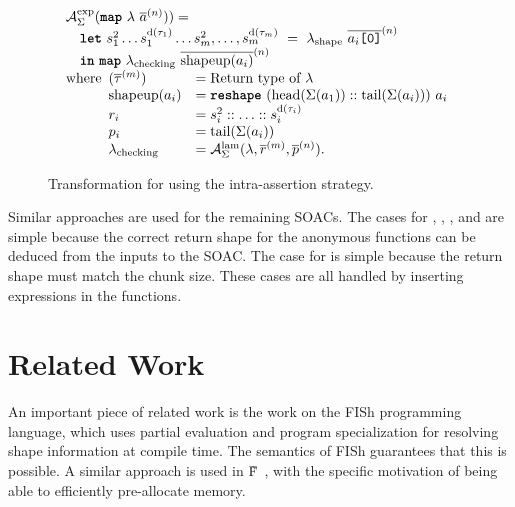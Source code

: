 \begin{figure}[t]
  \[
\begin{array}{l}
  \mathcal{A}_{\Sigma}^{\text{exp}}(\mbox{\texttt{\bfseries{map}}}~\lambda~\overline{a}^{(n)})) = \\
  \quad \mbox{\texttt{\bfseries{let}}}~s_{1}^{2} \ldots s_{1}^{\text{d}(\tau_{1})} \ldots s_{m}^{2}, \ldots, s_{m}^{\text{d}(\tau_{m})}~=~\lambda_{\text{\textrm{shape}}}~\overline{a_{i}\texttt{[0]}}^{(n)} \\
  \quad \mbox{\texttt{\bfseries{in}}}~\mbox{\texttt{\bfseries{map}}}~\lambda_{\text{checking}}~\overline{\textrm{shapeup}(a_{i})}^{(n)} \\
  \text{where}
  \begin{array}[t]{ll}
    (\overline{\tau}^{(m)}) & = \mbox{Return type of $\lambda$} \\
    \textrm{shapeup}(a_{i}) & = \mbox{\texttt{\bfseries{reshape}}}~(\textrm{head}(\Sigma(a_{1})) :: \textrm{tail}(\Sigma(a_{i})))~a_{i} \\
    r_{i} & = s_{i}^{2} :: \ldots :: s_{i}^{\text{d}(\tau_{i})} \\
    p_{i} & = \textrm{tail}(\Sigma(a_{i})) \\
    \lambda_{\text{\textrm{checking}}} & = \mathcal{A}_{\Sigma}^{\text{lam}}(\lambda,\overline{r}^{(m)},\overline{p}^{(n)}). \\

  \end{array}
\end{array}
\]

\caption[LoF entry]{Transformation for  using the
  intra-assertion strategy.}
\label{fig:sizeTransformMap}
\end{figure}

Similar approaches are used for the remaining SOACs.  The cases for
, , , and  are simple
because the correct return shape for the anonymous functions can be
deduced from the inputs to the SOAC.  The case for  is
simple because the return shape must match the chunk size.  These
cases are all handled by inserting  expressions in the
functions.

\section{Related Work}

An important piece of related work is the work on the FISh \cite{fish}
programming language, which uses partial evaluation and program
specialization for resolving shape information at compile time.  The
semantics of FISh guarantees that this is possible.  A similar
approach is used in \~{F}~\cite{shaikhha2017using}, with the specific
motivation of being able to efficiently pre-allocate memory.

